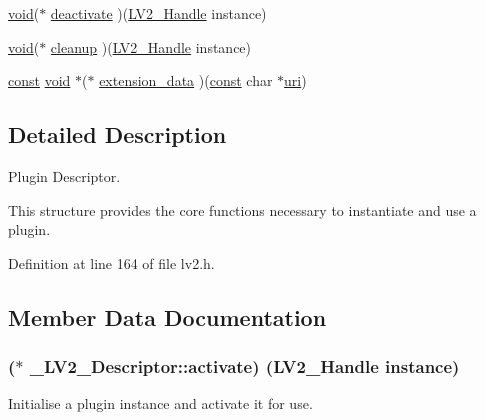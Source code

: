 \begin{DoxyCompactItemize}
\item 
\hyperlink{sound_8c_ae35f5844602719cf66324f4de2a658b3}{void}($\ast$ \hyperlink{struct___l_v2___descriptor_ab010fd53849be3de9beb99d7d936ab9c}{deactivate} )(\hyperlink{lv2_8h_a95eafb0a5290f30bcdc8c0f8eb992eaf}{L\+V2\+\_\+\+Handle} instance)
\item 
\hyperlink{sound_8c_ae35f5844602719cf66324f4de2a658b3}{void}($\ast$ \hyperlink{struct___l_v2___descriptor_a5dba64bee74fd5ade089462eb20c0e43}{cleanup} )(\hyperlink{lv2_8h_a95eafb0a5290f30bcdc8c0f8eb992eaf}{L\+V2\+\_\+\+Handle} instance)
\item 
\hyperlink{getopt1_8c_a2c212835823e3c54a8ab6d95c652660e}{const} \hyperlink{sound_8c_ae35f5844602719cf66324f4de2a658b3}{void} $\ast$($\ast$ \hyperlink{struct___l_v2___descriptor_a36da63991720b8ed2990d666b8369669}{extension\+\_\+data} )(\hyperlink{getopt1_8c_a2c212835823e3c54a8ab6d95c652660e}{const} char $\ast$\hyperlink{lib_2expat_8h_a5a9fdd6c2606370ad12f24c078ac6585}{uri})
\end{DoxyCompactItemize}


\subsection{Detailed Description}
Plugin Descriptor.

This structure provides the core functions necessary to instantiate and use a plugin. 

Definition at line 164 of file lv2.\+h.



\subsection{Member Data Documentation}
\subsubsection[{\texorpdfstring{activate}{activate}}]{($\ast$ \+\_\+\+L\+V2\+\_\+\+Descriptor\+::activate) ({\bf L\+V2\+\_\+\+Handle} instance)}\hypertarget{struct___l_v2___descriptor_ad6bfac334042df6d51f4f0f7c0a72241}{}\label{struct___l_v2___descriptor_ad6bfac334042df6d51f4f0f7c0a72241}
Initialise a plugin instance and activate it for use.


